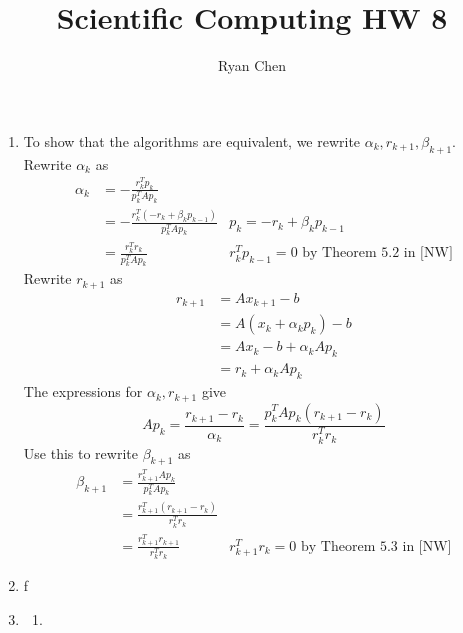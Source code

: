 \documentclass{article}
\title{Scientific Computing HW 8}
\author{Ryan Chen}
\renewcommand{\a}{\alpha}
\renewcommand{\b}{\beta}
\begin{document}
	
\maketitle



\begin{enumerate}
	
	
	
	\item To show that the algorithms are equivalent, we rewrite $\a_k,r_{k+1},\b_{k+1}$. Rewrite $\a_k$ as
	\begin{align*}
		\a_k &= -\frac{r_k^Tp_k}{p_k^TAp_k} \\
		&= -\frac{r_k^T(-r_k+\b_kp_{k-1})}{p_k^TAp_k} & p_k = -r_k+\b_kp_{k-1} \\
		&= \frac{r_k^Tr_k}{p_k^TAp_k} & \text{$r_k^Tp_{k-1}=0$ by Theorem 5.2 in [NW]}
	\end{align*}
	Rewrite $r_{k+1}$ as
	\begin{align*}
		r_{k+1} &= Ax_{k+1} - b \\
		&= A(x_k+\a_kp_k) - b \\
		&= Ax_k - b + \a_kAp_k \\
		&= r_k + \a_kAp_k
	\end{align*}
	The expressions for $\a_k,r_{k+1}$ give
	\[Ap_k = \frac{r_{k+1}-r_k}{\a_k} = \frac{p_k^TAp_k(r_{k+1}-r_k)}{r_k^Tr_k}\]
	Use this to rewrite $\b_{k+1}$ as
	\begin{align*}
		\b_{k+1} &= \frac{r_{k+1}^TAp_k}{p_k^TAp_k} \\
		&= \frac{r_{k+1}^T(r_{k+1}-r_k)}{r_k^Tr_k} \\
		&= \frac{r_{k+1}^Tr_{k+1}}{r_k^Tr_k} & \text{$r_{k+1}^Tr_k=0$ by Theorem 5.3 in [NW]}
	\end{align*}
	
	
	
	\pagebreak
	
	
	
	\item f
	
	
	
	\pagebreak
	
	
	
	\item
	
	\begin{enumerate}
		
		
		
		\item 
		
		
		

\end{enumerate}
\end{enumerate}
\end{document}
